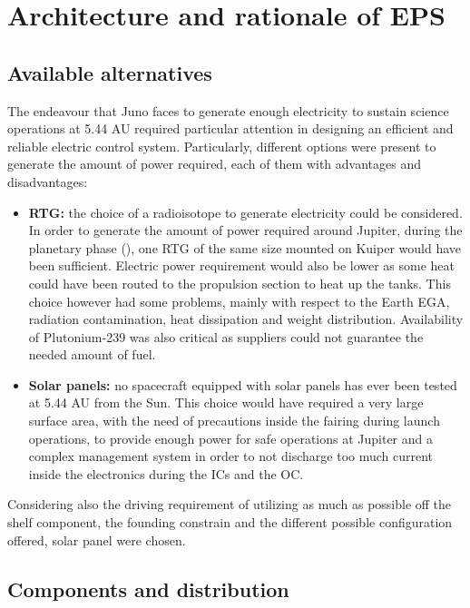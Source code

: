 \section{Architecture and rationale of EPS}
\label{sec:EPS_architecture_rationale}

\subsection{Available alternatives}
\label{subsec:available_alternatives}

The endeavour that Juno faces to generate enough electricity to sustain science operations at 5.44 AU required particular attention in designing an efficient and reliable electric control system. Particularly, different options were present to generate the amount of power required, each of them with advantages and disadvantages:

\begin{itemize}
    \item \textbf{RTG:} the choice of a radioisotope to generate electricity could be considered. In order to generate the amount of power required around Jupiter, during the planetary phase 
    (\mref), 
    one RTG of the same size mounted on Kuiper would have been sufficient. Electric power requirement would also be lower as some heat could have been routed to the propulsion section to heat up the tanks. This choice however had some problems, mainly with respect to the Earth EGA, radiation contamination, heat dissipation and weight distribution. Availability of Plutonium-239 was also critical as suppliers could not guarantee the needed amount of fuel.
    \mref %
    \item \textbf{Solar panels:} no spacecraft equipped with solar panels has ever been tested at 5.44 AU from the Sun. This choice would have required a very large surface area, with the need of precautions inside the fairing during launch operations, to provide enough power for safe operations at Jupiter and a complex management system in order to not discharge too much current inside the electronics during the ICs and the OC.
\end{itemize}

Considering also the driving requirement of utilizing as much as possible off the shelf component, the founding constrain and the different possible configuration offered, solar panel were chosen. 

\subsection{Components and distribution}
\label{subsec:components_and_distribution}